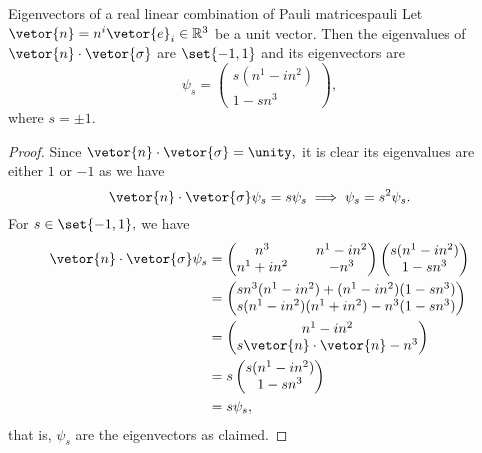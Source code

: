 \begin{lemma}{Eigenvectors of a real linear combination of Pauli matrices}{pauli}
   Let \(\vetor{n} = n^i \vetor{e}_i \in \mathbb{R}^3\) be a unit vector. Then the eigenvalues of \(\vetor{n}\cdot \vetor{\sigma}\) are \(\set{-1,1}\) and its eigenvectors are
   \begin{equation*}
      \psi_{s} = \begin{pmatrix}
          s( n^1 - i n^2)\\
          1 - s n^3
      \end{pmatrix},
   \end{equation*}
   where \(s = \pm1.\)
\end{lemma}
\begin{proof}
   Since \(\vetor{n} \cdot \vetor{\sigma} = \unity,\) it is clear its eigenvalues are either \(1\) or \(-1\) as we have
   \begin{equation*}
      \vetor{n} \cdot \vetor{\sigma} \psi_s = s \psi_s \implies \psi_s = s^2 \psi_s.
   \end{equation*}
   For \(s \in \set{-1,1},\) we have
   \begin{align*}
      \vetor{n} \cdot \vetor{\sigma} \psi_s &= \begin{pmatrix}
         n^3 && n^1 - i n^2\\
         n^1 + i n^2 && -n^3
      \end{pmatrix}
      \begin{pmatrix}
          s( n^1 - i n^2)\\
          1 - s n^3
      \end{pmatrix}\\
      &= 
      \begin{pmatrix}
         sn^3 (n^1 - in^2) + (n^1 - i n^2) (1 - sn^3)\\
         s(n^1 - in^2)(n^1 + in^2) - n^3(1 - sn^3)
      \end{pmatrix}\\
      &= \begin{pmatrix}
          n^1 - in^2\\
          s\vetor{n}\cdot\vetor{n} - n^3
      \end{pmatrix}\\
      &= s \begin{pmatrix}
          s(n^1 - in^2)\\
          1 - sn^3
      \end{pmatrix}\\
      &= s \psi_s,
   \end{align*}
   that is, \(\psi_s\) are the eigenvectors as claimed.
\end{proof}
